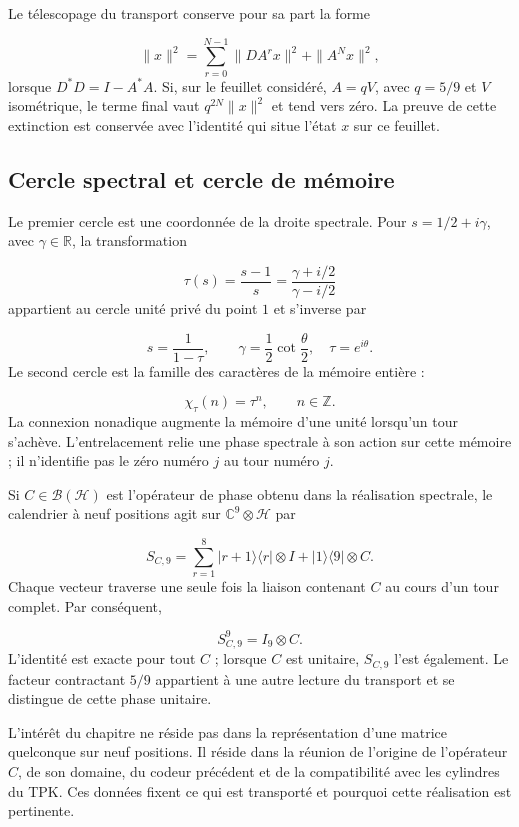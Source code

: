 Le télescopage du transport conserve pour sa part la forme

\[
\|x\|^2=\sum_{r=0}^{N-1}\|DA^rx\|^2+\|A^Nx\|^2,
\]
lorsque $D^*D=I-A^*A$. Si, sur le feuillet considéré, $A=qV$, avec $q=5/9$ et $V$ isométrique, le terme final vaut $q^{2N}\|x\|^2$ et tend vers zéro. La preuve de cette extinction est conservée avec l’identité qui situe l’état $x$ sur ce feuillet.

\subsection{Cercle spectral et cercle de mémoire}
Le premier cercle est une coordonnée de la droite spectrale. Pour $s=1/2+i\gamma$, avec \(\gamma\in\mathbb R\), la transformation

\[
\tau(s)=\frac{s-1}{s}
=\frac{\gamma+i/2}{\gamma-i/2}
\]
appartient au cercle unité privé du point \(1\) et s'inverse par

\[
s=\frac1{1-\tau},\qquad
\gamma=\frac12\cot\frac{\theta}{2},\quad\tau=e^{i\theta}.
\]
Le second cercle est la famille des caractères de la mémoire entière :

\[
\chi_\tau(n)=\tau^n,\qquad n\in\mathbb Z.
\]
La connexion nonadique augmente la mémoire d’une unité lorsqu’un tour s’achève. L’entrelacement relie une phase spectrale à son action sur cette mémoire ; il n’identifie pas le zéro numéro $j$ au tour numéro $j$.

Si \(C\in\mathcal B(\mathcal H)\) est l'opérateur de phase obtenu dans la réalisation spectrale, le calendrier à neuf positions agit sur \(\mathbb C^9\otimes\mathcal H\) par

\[
S_{C,9}=\sum_{r=1}^8|r+1\rangle\langle r|\otimes I
+|1\rangle\langle9|\otimes C.
\]
Chaque vecteur traverse une seule fois la liaison contenant $C$ au cours d'un tour complet. Par conséquent,

\[
S_{C,9}^9=I_9\otimes C.
\]
L'identité est exacte pour tout $C$ ; lorsque $C$ est unitaire, $S_{C,9}$ l'est également. Le facteur contractant $5/9$ appartient à une autre lecture du transport et se distingue de cette phase unitaire.

L'intérêt du chapitre ne réside pas dans la représentation d'une matrice quelconque sur neuf positions. Il réside dans la réunion de l'origine de l'opérateur $C$, de son domaine, du codeur précédent et de la compatibilité avec les cylindres du TPK. Ces données fixent ce qui est transporté et pourquoi cette réalisation est pertinente.

\clearpage
